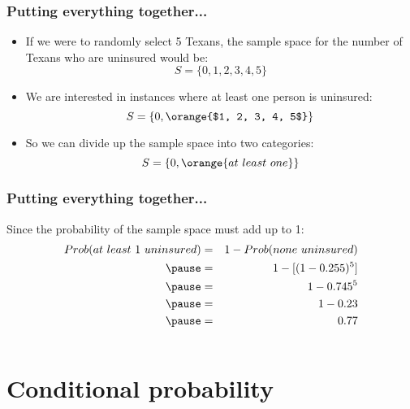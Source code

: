 \documentclass[slidestop,compress,mathserif]{beamer}
\begin{document}
\begin{frame}
\frametitle{Putting everything together...}


\begin{itemize}

\item If we were to randomly select 5 Texans, the sample space for the number of Texans who are uninsured would be:
\[ S = \{0, 1, 2, 3, 4, 5\} \]

\item We are interested in instances where at least one person is uninsured:
\[ S = \{0, \orange{$1, 2, 3, 4, 5$} \} \]

\item So we can divide up the sample space into two categories:
\[ S = \{0, \orange{at~least~one} \} \]

\end{itemize}

\end{frame}


\begin{frame}
\frametitle{Putting everything together...}

Since the probability of the sample space must add up to 1:
\begin{eqnarray*}
Prob(at~least~1~uninsured) &=& 1 - Prob(none~uninsured) \\
\pause
&=& 1 - [(1-0.255)^5] \\
\pause
&=& 1- 0.745^5 \\
\pause
&=& 1 - 0.23 \\
\pause
&=& 0.77
\end{eqnarray*}

$\:$ \\
$\:$ \\


\end{frame}



\section{Conditional probability}

\end{document}

